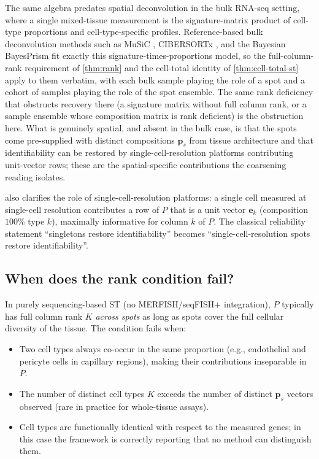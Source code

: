 The same algebra predates spatial deconvolution in the bulk RNA-seq
setting, where a single mixed-tissue measurement is the signature-matrix
product of cell-type proportions and cell-type-specific profiles.
Reference-based bulk deconvolution methods such as MuSiC
\citep{wang2019music}, CIBERSORTx \citep{newman2019digital}, and the
Bayesian BayesPrism \citep{chu2022bayesprism} fit exactly this
signature-times-proportions model, so the full-column-rank requirement of
\cref{thm:rank} and the cell-total identity of \cref{thm:cell-total-st}
apply to them verbatim, with each bulk sample playing the role of a spot
and a cohort of samples playing the role of the spot ensemble. The same
rank deficiency that obstructs recovery there (a signature matrix without
full column rank, or a sample ensemble whose composition matrix is rank
deficient) is the obstruction here. What is genuinely spatial, and absent
in the bulk case, is that the spots come pre-supplied with distinct
compositions $\bm{p}_s$ from tissue architecture and that identifiability
can be restored by single-cell-resolution platforms contributing
unit-vector rows; these are the spatial-specific contributions the
coarsening reading isolates.

 also clarifies the role of single-cell-resolution
platforms: a single cell measured at single-cell resolution
contributes a row of $P$ that is a unit vector $\bm{e}_k$ (composition
$100\%$ type $k$), maximally informative for column $k$ of $P$. The
classical reliability statement ``singletons restore identifiability''
becomes ``single-cell-resolution spots restore identifiability''.

\subsection{When does the rank condition fail?}

In purely sequencing-based ST (no MERFISH/seqFISH+ integration), $P$
typically has full column rank $K$ \emph{across spots} as long as
spots cover the full cellular diversity of the tissue. The condition
fails when:
\begin{itemize}
\item Two cell types always co-occur in the same proportion (e.g.,
  endothelial and pericyte cells in capillary regions), making their
  contributions inseparable in $P$.
\item The number of distinct cell types $K$ exceeds the number of
  distinct $\bm{p}_s$ vectors observed (rare in practice for
  whole-tissue assays).
\item Cell types are functionally identical with respect to the
  measured genes; in this case the framework is correctly reporting
  that no method can distinguish them.
\end{itemize}

